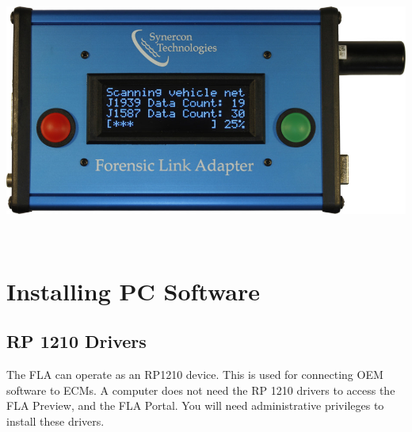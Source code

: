 \documentclass[11pt, oneside]{book}
\begin{document}
\hfill%
\begin{minipage}{0.45\textwidth} 
	\includegraphics[width=\linewidth]{../media/fla_screens/ethernet_and_others/veh_scan/scan_25} 
\end{minipage}\\


\section{Installing PC Software}

\subsection{RP 1210 Drivers}

The FLA can operate as an RP1210 device. This is used for connecting
OEM software to ECMs. A computer does not need the RP 1210 drivers
to access the FLA Preview, and the FLA Portal. You will need administrative
privileges to install these drivers.
\end{document}
